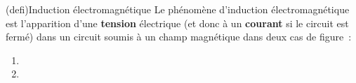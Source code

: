 \documentclass[../../main/main.tex]{subfiles}
\begin{document}

\begin{tcb*}(defi){Induction électromagnétique}
	Le phénomène d'induction électromagnétique est l'apparition d'une
	\textbf{tension} électrique (et donc à un \textbf{courant} si le circuit est
	fermé) dans un circuit soumis à un champ magnétique dans deux cas de figure~:
	\begin{enumerate}
		\item {}%
		\item {}%
	\end{enumerate}
\end{tcb*}
\end{document}
